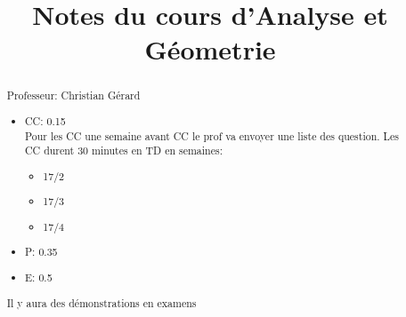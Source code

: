 \documentclass[a4paper]{report}
\title{Notes du cours d'Analyse et Géometrie}
\begin{document}
\maketitle
\tableofcontents

\begin{abstract}
Professeur: Christian Gérard
\begin{itemize}
    \item CC: 0.15\\
        Pour les CC une semaine avant CC le prof va envoyer une liste des question. Les CC durent 30 minutes en TD en semaines:
        \begin{itemize}
            \item 17/2
            \item 17/3
            \item 17/4
        \end{itemize}
    \item P: 0.35
    \item E: 0.5
\end{itemize}
Il y aura des démonstrations en examens
\end{abstract}



\end{document}
